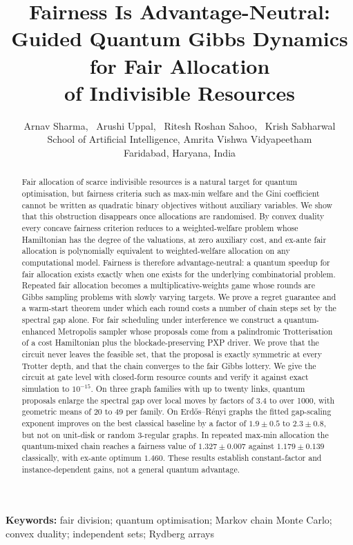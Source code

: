 \documentclass[11pt,a4paper]{article}
\title{\textbf{Fairness Is Advantage-Neutral:}\\[2pt]
\textbf{Guided Quantum Gibbs Dynamics for Fair Allocation}\\
\textbf{of Indivisible Resources}}
\author{Arnav Sharma, \ Arushi Uppal, \ Ritesh Roshan Sahoo, \ Krish Sabharwal\\[4pt]
\normalsize School of Artificial Intelligence, Amrita Vishwa Vidyapeetham\\
\normalsize Faridabad, Haryana, India}
\date{}
\begin{document}
\maketitle

\begin{abstract}
Fair allocation of scarce indivisible resources is a natural target for quantum optimisation,
but fairness criteria such as max-min welfare and the Gini coefficient cannot be written as
quadratic binary objectives without auxiliary variables. We show that this obstruction disappears
once allocations are randomised. By convex duality every concave fairness criterion reduces to a
weighted-welfare problem whose Hamiltonian has the degree of the valuations, at zero auxiliary cost,
and ex-ante fair allocation is polynomially equivalent to weighted-welfare allocation on any
computational model. Fairness is therefore advantage-neutral: a quantum speedup for fair allocation
exists exactly when one exists for the underlying combinatorial problem. Repeated fair allocation
becomes a multiplicative-weights game whose rounds are Gibbs sampling problems with slowly varying
targets. We prove a regret guarantee and a warm-start theorem under which each round costs a number
of chain steps set by the spectral gap alone. For fair scheduling under interference we construct a
quantum-enhanced Metropolis sampler whose proposals come from a palindromic Trotterisation of a cost
Hamiltonian plus the blockade-preserving PXP driver. We prove that the circuit never leaves the
feasible set, that the proposal is exactly symmetric at every Trotter depth, and that the chain
converges to the fair Gibbs lottery. We give the circuit at gate level with closed-form resource
counts and verify it against exact simulation to $10^{-15}$. On three graph families with up to
twenty links, quantum proposals enlarge the spectral gap over local moves by factors of 3.4 to over
1000, with geometric means of 20 to 49 per family. On Erd\H{o}s--R\'enyi graphs the fitted
gap-scaling exponent improves on the best classical baseline by a factor of $1.9\pm0.5$ to
$2.3\pm0.8$, but not on unit-disk or random 3-regular graphs. In repeated max-min allocation the
quantum-mixed chain reaches a fairness value of $1.327\pm0.007$ against $1.179\pm0.139$ classically,
with ex-ante optimum $1.460$. These results establish constant-factor and instance-dependent gains,
not a general quantum advantage.
\end{abstract}

\noindent\textbf{Keywords:} fair division; quantum optimisation; Markov chain Monte Carlo; convex
duality; independent sets; Rydberg arrays
\end{document}
